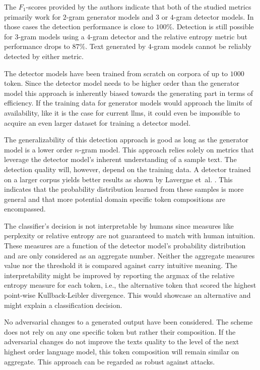     \begin{analysis}
        The $F_1$-scores provided by the authors indicate that both of the studied metrics primarily work for $2$-gram generator models and $3$ or $4$-gram detector models.
        In those cases the detection performance is close to $100\%$.
        Detection is still possible for $3$-gram models using a $4$-gram detector and the relative entropy metric but performance drops to $87\%$.
        Text generated by $4$-gram models cannot be reliably detected by either metric.

        The detector models have been trained from scratch on corpora of up to $1000$ token.
        Since the detector model needs to be higher order than the generator model this approach is inherently biased towards the generating part in terms of efficiency.
        If the training data for generator models would approach the limits of availability, like it is the case for current \acp{llm}, it could even be impossible to acquire an even larger dataset for training a detector model.

        The generalizability of this detection approach is good as long as the generator model is a lower order $n$-gram model.
        This approach relies solely on metrics that leverage the detector model's inherent understanding of a sample text.
        The detection quality will, however, depend on the training data.
        A detector trained on a larger corpus yields better results as shown by Lavergne et~al. \cite{lavergne2008detecting}.
        This indicates that the probability distribution learned from these samples is more general and that more potential domain specific token compositions are encompassed.

        The classifier's decision is not interpretable by humans since measures like perplexity or relative entropy are not guaranteed to match with human intuition.
        These measures are a function of the detector model's probability distribution and are only considered as an aggregate number.
        Neither the aggregate measures value nor the threshold it is compared against carry intuitive meaning.
        The interpretability might be improved by reporting the argmax of the relative entropy measure for each token, i.e., the alternative token that scored the highest point-wise Kullback-Leibler divergence.
        This would showcase an alternative and might explain a classification decision.

        No adversarial changes to a generated output have been considered.
        The scheme does not rely on any one specific token but rather their composition.
        If the adversarial changes do not improve the texts quality to the level of the next highest order language model, this token composition will remain similar on aggregate.
        This approach can be regarded as robust against attacks. 
    \end{analysis}

